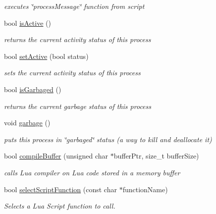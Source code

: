 \begin{CompactItemize}
\begin{CompactList}\small\item\em executes \char`\"{}processMessage\char`\"{} function from script \item\end{CompactList}\item 
bool \hyperlink{classEOSProcess_e0e33032bb4be23f342515af1a3ff911}{isActive} ()
\begin{CompactList}\small\item\em returns the current activity status of this process \item\end{CompactList}\item 
bool \hyperlink{classEOSProcess_b5760c226c46227d395ec2e8fef7d340}{setActive} (bool status)
\begin{CompactList}\small\item\em sets the current activity status of this process \item\end{CompactList}\item 
bool \hyperlink{classEOSProcess_d5f8f932b1194afba3e3e4f37883e29a}{isGarbaged} ()
\begin{CompactList}\small\item\em returns the current garbage status of this process \item\end{CompactList}\item 
void \hyperlink{classEOSProcess_bec41530a483ecc6b9b35b34388515ec}{garbage} ()
\begin{CompactList}\small\item\em puts this process in \char`\"{}garbaged\char`\"{} status (a way to kill and deallocate it) \item\end{CompactList}\item 
bool \hyperlink{classEOSLuaScript_c1d576d2d3ffa64a9437a062f325a813}{compileBuffer} (unsigned char $\ast$bufferPtr, size\_\-t bufferSize)
\begin{CompactList}\small\item\em calls Lua compiler on Lua code stored in a memory buffer \item\end{CompactList}\item 
bool \hyperlink{classEOSLuaScript_7f00ff555be32da27000d51bc7ba420f}{selectScriptFunction} (const char $\ast$functionName)
\begin{CompactList}\small\item\em Selects a Lua Script function to call. \item\end{CompactList}\item 

\end{CompactItemize}
